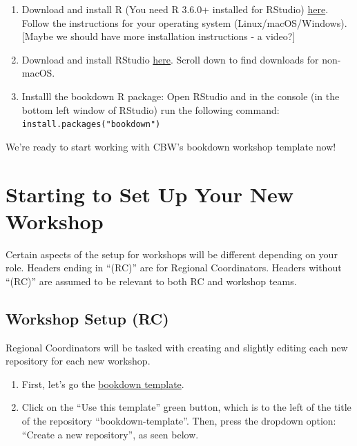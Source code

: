 \documentclass[
]{book}
\theoremstyle{definition}
\theoremstyle{definition}
\theoremstyle{definition}
\theoremstyle{definition}
\theoremstyle{remark}
\begin{document}
\begin{enumerate}
\def\labelenumi{\arabic{enumi}.}
\item
  Download and install R (You need R 3.6.0+ installed for RStudio) \href{https://cran.rstudio.com/}{here}. Follow the instructions for your operating system (Linux/macOS/Windows).
  {[}Maybe we should have more installation instructions - a video?{]}
\item
  Download and install RStudio \href{https://posit.co/download/rstudio-desktop/\#:~:text=AND\%20INSTALL\%20R-,2\%3A\%20Install\%20RStudio,-DOWNLOAD\%20RSTUDIO\%20DESKTOP}{here}. Scroll down to find downloads for non-macOS.
\item
  Installl the bookdown R package: Open RStudio and in the console (in the bottom left window of RStudio) run the following command: \texttt{install.packages("bookdown")}
\end{enumerate}

We're ready to start working with CBW's bookdown workshop template now!

\chapter{\texorpdfstring{Starting to Set Up Your \textbf{New} Workshop}{Starting to Set Up Your New Workshop}}\label{starting-to-set-up-your-new-workshop}

Certain aspects of the setup for workshops will be different depending on your role. Headers ending in ``(RC)'' are for Regional Coordinators. Headers without ``(RC)'' are assumed to be relevant to both RC and workshop teams.

\section{Workshop Setup (RC)}\label{workshop-setup-rc}

Regional Coordinators will be tasked with creating and slightly editing each new repository for each new workshop.

\begin{enumerate}
\def\labelenumi{\arabic{enumi}.}
\item
  First, let's go the \href{https://github.com/cbw-dev/bookdown-template}{bookdown template}.
\item
  Click on the ``Use this template'' green button, which is to the left of the title of the repository ``bookdown-template''. Then, press the dropdown option: ``Create a new repository'', as seen below.
\end{enumerate}
\end{document}
